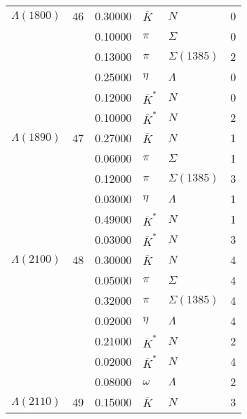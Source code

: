 \documentclass[a4paper,10pt]{article}
\begin{document}
\begin{tabular}[t]{lrllll} 
\toprule
$      \Lambda(1800) $& 46& 0.30000&$ \overline{K}        $ &$ N                   $& 0\\
$                    $&   & 0.10000&$ \pi                 $ &$ \Sigma              $& 0\\
$                    $&   & 0.13000&$ \pi                 $ &$ \Sigma(1385)        $& 2\\
$                    $&   & 0.25000&$ \eta                $ &$ \Lambda             $& 0\\
$                    $&   & 0.12000&$ \overline{K}^*      $ &$ N                   $& 0\\
$                    $&   & 0.10000&$ \overline{K}^*      $ &$ N                   $& 2\\
\midrule
$      \Lambda(1890) $& 47& 0.27000&$ \overline{K}        $ &$ N                   $& 1\\
$                    $&   & 0.06000&$ \pi                 $ &$ \Sigma              $& 1\\
$                    $&   & 0.12000&$ \pi                 $ &$ \Sigma(1385)        $& 3\\
$                    $&   & 0.03000&$ \eta                $ &$ \Lambda             $& 1\\
$                    $&   & 0.49000&$ \overline{K}^*      $ &$ N                   $& 1\\
$                    $&   & 0.03000&$ \overline{K}^*      $ &$ N                   $& 3\\
\midrule
$      \Lambda(2100) $& 48& 0.30000&$ \overline{K}        $ &$ N                   $& 4\\
$                    $&   & 0.05000&$ \pi                 $ &$ \Sigma              $& 4\\
$                    $&   & 0.32000&$ \pi                 $ &$ \Sigma(1385)        $& 4\\
$                    $&   & 0.02000&$ \eta                $ &$ \Lambda             $& 4\\
$                    $&   & 0.21000&$ \overline{K}^*      $ &$ N                   $& 2\\
$                    $&   & 0.02000&$ \overline{K}^*      $ &$ N                   $& 4\\
$                    $&   & 0.08000&$ \omega              $ &$ \Lambda             $& 2\\
\midrule
$      \Lambda(2110) $& 49& 0.15000&$ \overline{K}        $ &$ N                   $& 3\\

\end{tabular}
\end{document}
